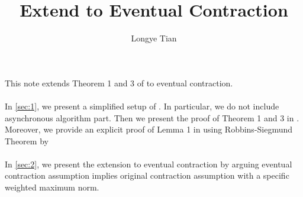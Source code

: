 
\title{Extend \cite{tsitsiklis1994asynchronous} to Eventual Contraction}
\author{Longye Tian}

\maketitle
This note extends Theorem 1 and 3 of \cite{tsitsiklis1994asynchronous} to eventual contraction.\\
\\
\indent In \autoref{sec:1}, we present a simplified setup of \cite{tsitsiklis1994asynchronous}. In particular, we do not include asynchronous algorithm part. Then we present the proof of Theorem 1 and 3 in \cite{tsitsiklis1994asynchronous}. Moreover, we provide an explicit proof of Lemma 1 in \cite{tsitsiklis1994asynchronous} using Robbins-Siegmund Theorem by \cite{robbins1971convergence}\\
\\
\indent In \autoref{sec:2}, we present the extension to eventual contraction by arguing eventual contraction assumption implies original contraction assumption with a specific weighted maximum norm.
\tableofcontents
\newpage





\newpage

\printbibliography{}
\newpage

\appendix
\appendixpage{}



